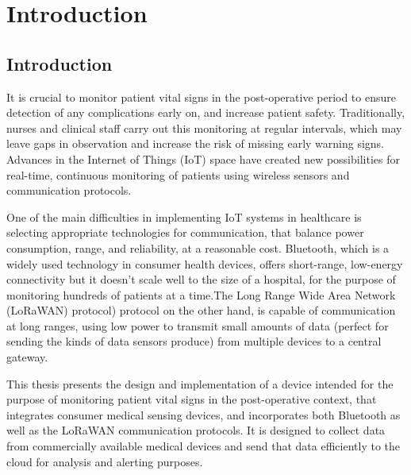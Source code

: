 \chapter{Introduction}

\section{Introduction} %
It is crucial to monitor patient vital signs in the post-operative period to ensure detection of any complications early on, and increase patient safety. Traditionally, nurses and clinical staff carry out this monitoring at regular intervals, which may leave gaps in observation and increase the risk of missing early warning signs. Advances in the Internet of Things (IoT) space have created new possibilities for real-time, continuous monitoring of patients using wireless sensors and communication protocols.

One of the main difficulties in implementing IoT systems in healthcare is selecting appropriate technologies for communication, that balance power consumption, range, and reliability, at a reasonable cost. Bluetooth, which is a widely used technology in consumer health devices, offers short-range, low-energy connectivity but it doesn't scale well to the size of a hospital, for the purpose of monitoring hundreds of patients at a time.The Long Range Wide Area Network (LoRaWAN) protocol) protocol on the other hand, is capable of communication at long ranges, using low power to transmit small amounts of data (perfect for sending the kinds of data sensors produce) from multiple devices to a central gateway.

This thesis presents the design and implementation of a device intended for the purpose of monitoring patient vital signs in the post-operative context, that integrates consumer medical sensing devices, and incorporates both Bluetooth as well as the LoRaWAN communication protocols. It is designed to collect data from commercially available medical devices and send that data efficiently to the cloud for analysis and alerting purposes.


